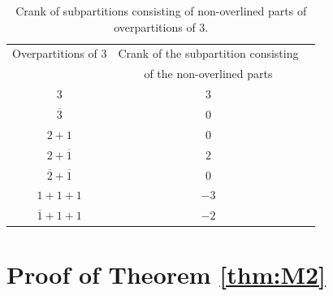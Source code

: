 \documentclass[10pt,a4paper]{amsart}
\numberwithin{equation}{section}
\newcommand\thm[1]{\ref{thm:#1}}
\begin{document}
\begin{table}[t]\centering
\caption{Crank of subpartitions consisting of non-overlined parts of overpartitions of $3$.}\label{t2}
\vspace{2mm}
\begin{tabular}{ c c c }
Overpartitions of $3$ & Crank of the subpartition consisting \\ &of the non-overlined parts \\
 $3$                         & $3$ \\
 $\overline{3}$              & $0$ \\
 $2+1$                       & $0$ \\
 $2+\overline{1}$            & $2$ \\
 $\overline{2}+\overline{1}$ & $0$ \\
 $1+1+1$                     & \hspace{-3mm}$-3$ \\
 $\overline{1}+1+1$          & \hspace{-3mm}$-2$
\end{tabular}
\end{table}


\section{Proof of Theorem \thm{M2}}\label{section3}
\end{document}
